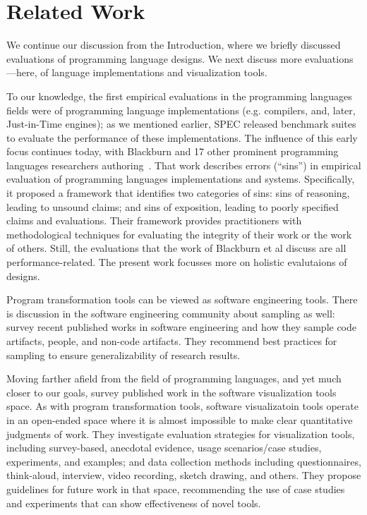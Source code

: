 \section{Related Work}
\label{sec:related}
We continue our discussion from the Introduction, where we briefly
discussed evaluations of programming language designs. We next discuss
more evaluations---here, of language implementations and visualization
tools.

To our knowledge, the first empirical evaluations in the programming
languages fields were of programming language implementations
(e.g. compilers, and, later, Just-in-Time engines); as we mentioned
earlier, SPEC released benchmark suites to evaluate the performance of
these implementations. The influence of this early focus continues
today, with Blackburn and 17 other prominent programming languages
researchers
authoring~\cite{blackburn16:_truth_whole_truth_nothin_but_truth}. That
work describes errors (``sins'') in empirical evaluation of programming
languages implementations and systems.  Specifically, it proposed a
framework that identifies two categories of sins: sins of reasoning,
leading to unsound claims; and sins of exposition, leading to poorly
specified claims and evaluations. Their framework provides
practitioners with methodological techniques for evaluating the
integrity of their work or the work of others.  Still, the evaluations
that the work of Blackburn et al discuss are all
performance-related. The present work focusses more on holistic
evalutaions of designs.

Program transformation tools can be viewed as software engineering tools.
There is discussion in the software engineering community about sampling as well:
 survey recent published works in software
engineering and how they sample code artifacts, people, and non-code artifacts.
They recommend best practices for sampling to ensure generalizability of research
results.

Moving farther afield from the field of programming languages, and yet
much closer to our goals,
 survey
published work in the software visualization tools space. As with
program transformation tools, software visualizatoin tools operate in
an open-ended space where it is almost impossible to make clear
quantitative judgments of work. They investigate evaluation strategies
for visualization tools, including survey-based, anecdotal evidence,
usage scenarios/case studies, experiments, and examples; and data
collection methods including questionnaires, think-aloud, interview,
video recording, sketch drawing, and others. They propose guidelines
for future work in that space, recommending the use of case studies
and experiments that can show effectiveness of novel tools.




